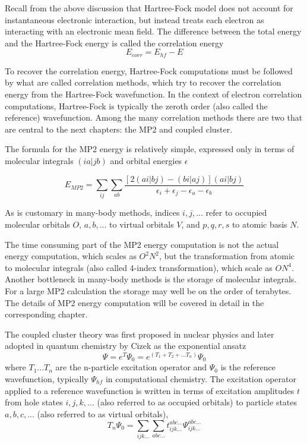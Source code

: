 \documentclass[12pt]{book} \usepackage[margin=1in]{geometry}
\begin{document}
Recall from the above discussion that Hartree-Fock model does not
account for instantaneous electronic interaction, but instead treats
each electron as interacting with an electronic mean field.
The difference between the total energy and  the Hartree-Fock
energy is called the correlation energy
$$E_{corr} = E_{hf} - E$$

To recover the correlation energy, Hartree-Fock computations must be
followed by what are called correlation methods, which try to recover
the correlation energy from the Hartree-Fock wavefunction.  In the
context of electron correlation computations, Hartree-Fock is
typically the zeroth order (also called the reference) wavefunction.
Among the many correlation methods there are two that are central to
the next chapters: the MP2 and coupled cluster.

The formula for the MP2 energy is relatively simple,
expressed only in terms of molecular integrals $(ia|jb)$
and orbital energies $\epsilon$

$$E_{MP2} = \sum_{ij} \sum_{ab} 
\frac{ [2(ai|bj) - (bi|aj)] (ai|bj) }
{\epsilon_i + \epsilon_j - \epsilon_a - \epsilon_b}$$

As is customary in many-body methods, indices $i,j,...$ refer to
occupied molecular orbitals $O$, $a,b,...$ to virtual orbitals $V$,
and $p,q,r,s$ to atomic basis $N$. 

The time consuming part of the MP2 energy computation is not the
actual energy computation, which scales as $O^2N^2$, but the
transformation from atomic to molecular integrals (also called 4-index
transformation), which scale as $ON^4$.  Another bottleneck in
many-body methods is the storage of molecular integrals.  For a large
MP2 calculation the storage may well be on the order of terabytes.
The details of MP2 energy computation will be covered in detail in
the corresponding chapter.

The coupled cluster theory was first proposed in nuclear physics
\cite{coester1960short} and later adopted in quantum chemistry by
Cizek \cite{vcivzek1966correlation} as the exponential ansatz
$$\Psi = e^{T} \Psi_0 = e^{(T_1 + T_2 + ... T_n)} \Psi_0$$ 
where $T_1 ... T_n$ are the n-particle excitation operator and $\Psi_0$
is the reference wavefunction, typically $\Psi_{hf}$ in computational
chemistry.
The excitation operator applied to a reference wavefunction is written
in terms of excitation amplitudes $t$ from hole states $i,j,k,...$
(also referred to as occupied orbitals) to
particle states $a,b,c,...$ (also referred to as virtual orbitals),
$$T_n \Psi_0 = \sum_{ijk...} \sum_{abc...} t_{ijk...} ^ {abc...}
\Psi_{ijk...} ^ {abc...}$$
\end{document}
